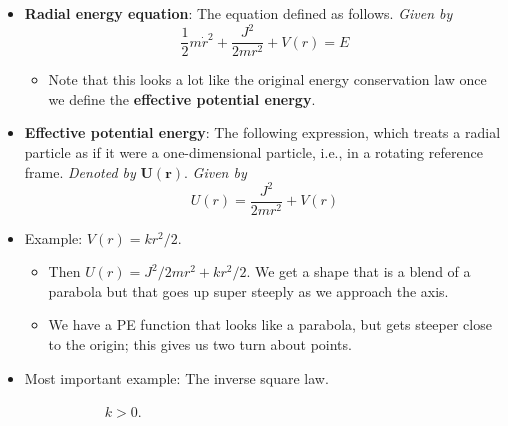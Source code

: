 \documentclass[../notes.tex]{subfiles}
\begin{document}
\begin{itemize}
\begin{itemize}
    \end{itemize}
    \item \textbf{Radial energy equation}: The equation defined as follows. \emph{Given by}
    \begin{equation*}
        \frac{1}{2}m\dot{r}^2+\frac{J^2}{2mr^2}+V(r) = E
    \end{equation*}
    \begin{itemize}
        \item Note that this looks a lot like the original energy conservation law once we define the \textbf{effective potential energy}.
    \end{itemize}
    \item \textbf{Effective potential energy}: The following expression, which treats a radial particle as if it were a one-dimensional particle, i.e., in a rotating reference frame. \emph{Denoted by} $\bm{U(r)}$. \emph{Given by}
    \begin{equation*}
        U(r) = \frac{J^2}{2mr^2}+V(r)
    \end{equation*}
    \item Example: $V(r)=kr^2/2$.
    \begin{itemize}
        \item Then $U(r)=J^2/2mr^2+kr^2/2$. We get a shape that is a blend of a parabola but that goes up super steeply as we approach the axis.
        \item We have a PE function that looks like a parabola, but gets steeper close to the origin; this gives us two turn about points.
    \end{itemize}
    \item Most important example: The inverse square law.
    \begin{figure}[H]
        \centering
        \begin{subfigure}[b]{0.3\linewidth}
            \centering
            \caption{$k>0$.}
            \label{fig:invSqPota}
        \end{subfigure}
        \begin{subfigure}[b]{0.3\linewidth}
            \centering
\end{subfigure}
\end{figure}
\end{itemize}
\end{document}
